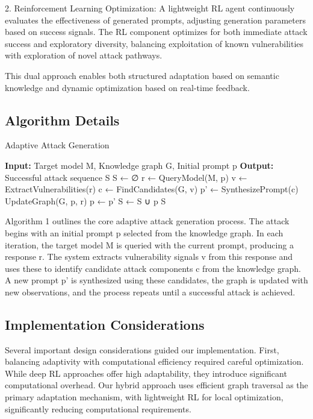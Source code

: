 2. Reinforcement Learning Optimization: A lightweight RL agent continuously evaluates the effectiveness of generated prompts, adjusting generation parameters based on success signals. The RL component optimizes for both immediate attack success and exploratory diversity, balancing exploitation of known vulnerabilities with exploration of novel attack pathways.

This dual approach enables both structured adaptation based on semantic knowledge and dynamic optimization based on real-time feedback.

\subsection{Algorithm Details}
\begin{algorithm}
\caption{Adaptive Attack Generation}
\label{alg:attack_gen}
\begin{algorithmic}[1]
\State \textbf{Input:} Target model M, Knowledge graph G, Initial prompt p
\State \textbf{Output:} Successful attack sequence S
\State S ← ∅
    \State r ← QueryModel(M, p)
    \State v ← ExtractVulnerabilities(r)
    \State c ← FindCandidates(G, v)
    \State p' ← SynthesizePrompt(c)
    \State UpdateGraph(G, p, r)
    \State p ← p'
    \State S ← S ∪ {p}
\EndWhile
\State \Return S
\end{algorithmic}
\end{algorithm}

Algorithm 1 outlines the core adaptive attack generation process. The attack begins with an initial prompt p selected from the knowledge graph. In each iteration, the target model M is queried with the current prompt, producing a response r. The system extracts vulnerability signals v from this response and uses these to identify candidate attack components c from the knowledge graph. A new prompt p' is synthesized using these candidates, the graph is updated with new observations, and the process repeats until a successful attack is achieved.

\subsection{Implementation Considerations}
Several important design considerations guided our implementation. First, balancing adaptivity with computational efficiency required careful optimization. While deep RL approaches offer high adaptability, they introduce significant computational overhead. Our hybrid approach uses efficient graph traversal as the primary adaptation mechanism, with lightweight RL for local optimization, significantly reducing computational requirements.

